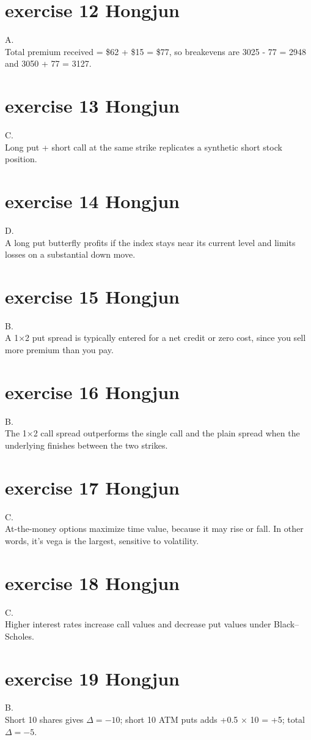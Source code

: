 \documentclass{article}
\begin{document}
\section{exercise 12 Hongjun}
A.\\
Total premium received = \$62 + \$15 = \$77, so breakevens are 3025 - 77 = 2948 and 3050 + 77 = 3127.

\section{exercise 13 Hongjun}
C.\\
Long put + short call at the same strike replicates a synthetic short stock position.

\section{exercise 14 Hongjun}
D.\\
A long put butterfly profits if the index stays near its current level and limits losses on a substantial down move.

\section{exercise 15 Hongjun}
B.\\
A 1×2 put spread is typically entered for a net credit or zero cost, since you sell more premium than you pay.

\section{exercise 16 Hongjun}
B.\\
The 1×2 call spread outperforms the single call and the plain spread when the underlying finishes between the two strikes.

\section{exercise 17 Hongjun}
C.\\
At-the-money options maximize time value, because it may rise or fall. In other words, it’s vega is the largest, sensitive to volatility.

\section{exercise 18 Hongjun}
C.\\
Higher interest rates increase call values and decrease put values under Black–Scholes.

\section{exercise 19 Hongjun}
B.\\
Short 10 shares gives $\Delta = −10$; short 10 ATM puts adds +0.5 × 10 = +5; total $\Delta = −5$.
\end{document}
